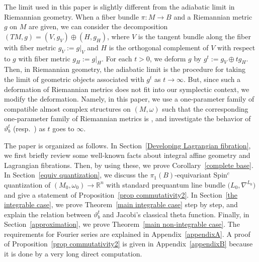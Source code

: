 \documentclass[10pt,a4paper]{amsart}
\numberwithin{equation}{section}
\newcommand{\R}{\mathbb{R}}
\renewcommand{\tilde}{\widetilde}
\begin{document}
The limit used in this paper is slightly different from the adiabatic limit in Riemannian geometry. When a fiber bundle $\pi\colon M\to B$ and a Riemannian metric $g$ on $M$ are given, we can consider the decomposition $(TM, g)=(V, g_V)\oplus (H, g_H)$, where $V$ is the tangent bundle along the fiber with fiber metric $g_V:=g|_V$ and $H$ is the orthogonal complement of $V$ with respect to $g$ with fiber metric $g_H:=g|_H$. For each $t>0$, we deform $g$ by
$g^t:=g_V\oplus tg_H$. Then, in Riemannian geometry, the adiabatic limit is the procedure for taking the limit of geometric objects associated with
$g^t$ as $t\to \infty$. But, since such a deformation of Riemannian metrics does not fit into our symplectic context, we modify the deformation. Namely, in this paper, we use a one-parameter family  of compatible almost complex structures on $(M,\omega)$ such that the corresponding one-parameter family of Riemannian metrics is , and investigate the behavior of $\vartheta^t_b$ \big(resp.\ \smash{${\tilde \vartheta}^t_b$}\big) as $t$ goes to $\infty$.

The paper is organized as follows. In Section~\ref{Developing Lagrangian fibration}, we first briefly review some well-known facts about integral affine geometry and Lagrangian fibrations. Then, by using these, we prove Corollary~\ref{complete base}. In Section~\ref{equiv quantization}, we discuss the $\pi_1(B)$-equivariant Spin${}^c$ quantization of ${(M_0, \omega_0)\to \R^n}$
with standard prequantum line bundle $\bigl( L_0, \nabla^{L_0}\bigr)$ and give a statement of Proposition~\ref{prop commutativity2}. In Section~\ref{the integrable case}, we prove Theorem~\ref{main integrable case} step by step, and explain the relation between $\vartheta^t_b$ and Jacobi's classical theta function. Finally, in Section~\ref{approximation}, we prove Theorem~\ref{main non-integrable case}. The requirements for Fourier series are explained in Appendix~\ref{appendixA}. A proof of Proposition~\ref{prop commutativity2} is given in Appendix~\ref{appendixB} because it is done by a very long direct computation.
\end{document}
